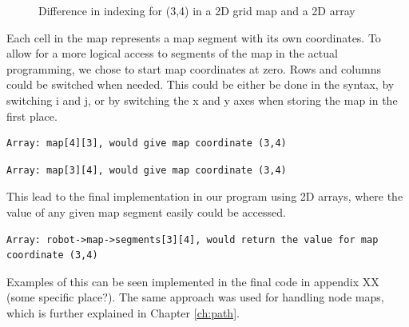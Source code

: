 \begin{figure}[htp]
    \centering
    \hspace{0.05\textwidth}  
    \caption{Difference in indexing for (3,4) in a 2D grid map and a 2D array}
    \label{fig:floor_plans}
\end{figure}

Each cell in the map represents a map segment with its own coordinates. To allow for a more logical access to segments of the map in the actual programming, we chose to start map coordinates at zero. Rows and columns could be switched when needed. This could be either be done in the syntax, by switching i and j, or by switching the x and y axes when storing the map in the first place.
\\

\begin{lstlisting}[caption={Example of map segment before rows and columns are switched}]
Array: map[4][3], would give map coordinate (3,4)
\end{lstlisting}

\begin{lstlisting}[caption={Example of map segment after switching rows and columns}]
Array: map[3][4], would give map coordinate (3,4)
\end{lstlisting}

This lead to the final implementation in our program using 2D arrays, 
where the value of any given map segment easily could be accessed. 
\\
\begin{lstlisting}[caption={Example of implementation in the final code}]
Array: robot->map->segments[3][4], would return the value for map coordinate (3,4)
\end{lstlisting}
Examples of this can be seen implemented in the final code in appendix XX (some specific place?). 
The same approach was used for handling node maps, which is further explained in Chapter \ref{ch:path}.


